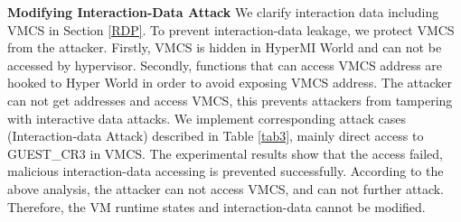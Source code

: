 \documentclass[conference]{IEEEtran}
\begin{document}
\textbf{Modifying Interaction-Data Attack}
We clarify interaction data including VMCS in Section \ref{RDP}.
 To prevent interaction-data leakage, we protect VMCS from the attacker. Firstly, VMCS is hidden in HyperMI World and can not be accessed by hypervisor. Secondly, functions that can access VMCS address are hooked to Hyper World in order to avoid exposing VMCS address. The attacker can not get addresses and access VMCS, this prevents attackers from tampering with interactive data attacks. We implement corresponding attack cases (Interaction-data Attack) described in Table \ref{tab3}, mainly direct access to GUEST\_CR3 in VMCS. The experimental results show that the access failed, malicious interaction-data accessing is prevented successfully. According to the above analysis, the attacker can not access VMCS, and can not further attack. Therefore, the VM runtime states and interaction-data cannot be modified. 


\end{document}
